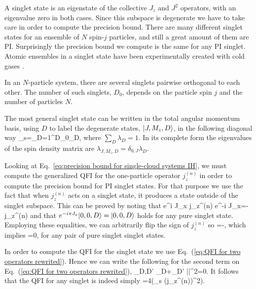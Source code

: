 A singlet state is an eigenstate of the collective $J_z$ and $J^2$
operators, with an eigenvalue zero in both cases.
Since this subspace is degenerate we have to take care in order to compute the
precision bound. There are many different singlet states for an ensemble of $N$
spin-$j$ particles, and still a great amount of them are PI.
Surprisingly the precision bound we compute is the same
for any PI singlet. Atomic ensembles in a singlet state have been experimentally
created with cold gases \cite{Toth2010,Behbood2014}.

In an $N$-particle system, there are several singlets pairwise orthogonal to each other. The number of such singlets, $D_0$, depends on the particle spin $j$ and the number of particles $N$.

The most general singlet state can be written in the total angular momentum basis, using $D$ to label the degenerate states, $\vert J,M_z,D \rangle$, in the following diagonal way
\be
\rho_{\rm s}=\sum_{D=1}^{D_0}\lambda_D,
\label{eq:definition of a general singlet}
\ee
where $\sum_D \lambda_D=1$.
In its complete form the eigenvalues of the spin density matrix are $\lambda_{J,M_z,D}=\delta_{0,J}\lambda_D$.

Looking at Eq.~\eqref{eq:precision bound for single-cloud systems IH},
we must compute the generalized QFI for the one-particle operator $j_z^{(n)}$
in order to compute the precision bound for PI singlet states.
For that purpose we use the fact that when $j_z^{(n)}$ acts on a
singlet state, it produces a state outside of the singlet subspace.
This can be proved by noting that
\be
e^{i \pi J_x} j_z^{(n)} e^{-i \pi
J_x}=-j_z^{(n)}
\ee
and that $e^{-i\pi J_x} \vert 0,0,D \rangle = \vert 0,0,D \rangle$
holds for any pure singlet state.
Employing these equalities, we can arbitrarily flip the sign of $j_z^{(n)}$ so
\be
{}
=-,
\ee
which implies
\be
\label{eq:jzn in subspace of singlets is a null operator}
=0,
\ee
for any pair of pure singlet singlet states.

In order to compute the QFI for the singlet state we use
Eq.~(\ref{eq:QFI for two operators rewrited}). Hence we can write the
following for the second term on Eq.~(\ref{eq:QFI for two operators rewrited}),
\sum_{D,D'}
{\lambda_D+\lambda_{D'}}
||^2=0.
\ee
It follows that the QFI for any singlet is indeed simply
\be
\label{eq:qfi to trace in the case of singlet}
=4\tr({\rho_{\rm s} (j_z^{(n)})^2}).
\ee


